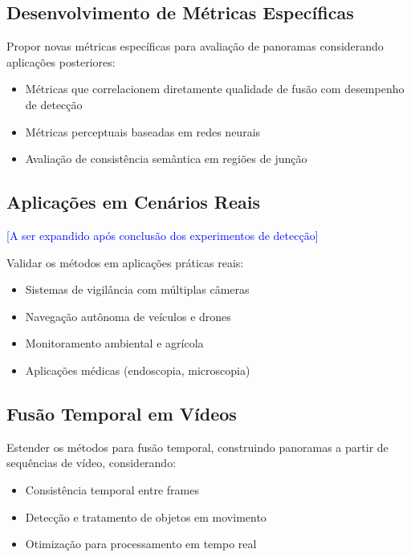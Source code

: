 \subsection{Desenvolvimento de Métricas Específicas}

Propor novas métricas específicas para avaliação de panoramas considerando aplicações posteriores:

\begin{itemize}
    \item Métricas que correlacionem diretamente qualidade de fusão com desempenho de detecção
    \item Métricas perceptuais baseadas em redes neurais
    \item Avaliação de consistência semântica em regiões de junção
\end{itemize}

\subsection{Aplicações em Cenários Reais}

\textcolor{blue}{[A ser expandido após conclusão dos experimentos de detecção]}

Validar os métodos em aplicações práticas reais:

\begin{itemize}
    \item Sistemas de vigilância com múltiplas câmeras
    \item Navegação autônoma de veículos e drones
    \item Monitoramento ambiental e agrícola
    \item Aplicações médicas (endoscopia, microscopia)
\end{itemize}

\subsection{Fusão Temporal em Vídeos}

Estender os métodos para fusão temporal, construindo panoramas a partir de sequências de vídeo, considerando:

\begin{itemize}
    \item Consistência temporal entre frames
    \item Detecção e tratamento de objetos em movimento
    \item Otimização para processamento em tempo real
\end{itemize}

